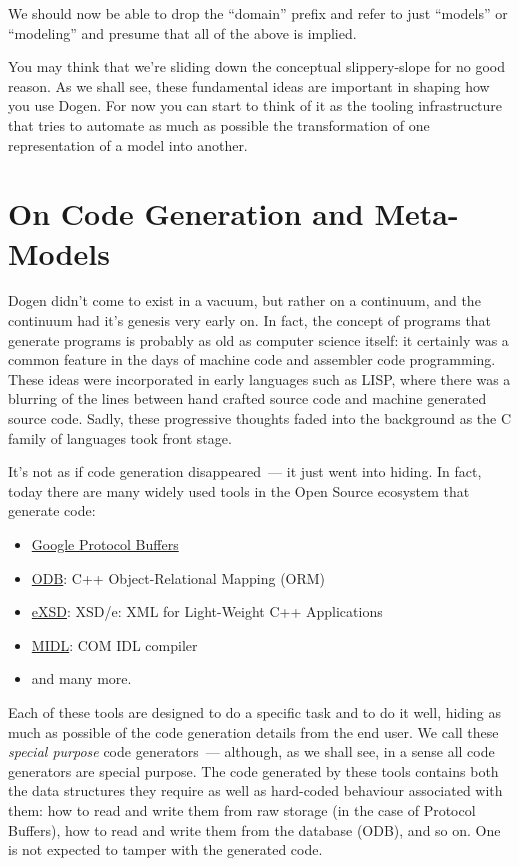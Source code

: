 \documentclass{book}
\begin{document}
We should now be able to drop the ``domain'' prefix and refer to just
``models'' or ``modeling'' and presume that all of the above is implied.

You may think that we're sliding down the conceptual slippery-slope
for no good reason. As we shall see, these fundamental ideas are
important in shaping how you use Dogen. For now you can start to think
of it as the tooling infrastructure that tries to automate as much as
possible the transformation of one representation of a model into
another.

\section{On Code Generation and Meta-Models}

Dogen didn't come to exist in a vacuum, but rather on a continuum, and
the continuum had it's genesis very early on. In fact, the concept of
programs that generate programs is probably as old as computer science
itself: it certainly was a common feature in the days of machine code
and assembler code programming. These ideas were incorporated in early
languages such as LISP, where there was a blurring of the lines
between hand crafted source code and machine generated source
code. Sadly, these progressive thoughts faded into the background as
the C family of languages took front stage.

It's not as if code generation disappeared~--- it just went into
hiding. In fact, today there are many widely used tools in the Open
Source ecosystem that generate code:

\begin{itemize}
\item \href{https://developers.google.com/protocol-buffers/}{Google Protocol Buffers}
\item \href{http://www.codesynthesis.com/products/odb/}{ODB}: C++ Object-Relational Mapping (ORM)
\item \href{http://www.codesynthesis.com/products/xsde/}{eXSD}: XSD/e: XML for Light-Weight C++ Applications
\item \href{http://msdn.microsoft.com/en-us/library/windows/desktop/aa367300(v\%3Dvs.85).aspx}{MIDL}: COM IDL compiler
\item and many more.
\end{itemize}

Each of these tools are designed to do a specific task and to do it
well, hiding as much as possible of the code generation details from
the end user. We call these \emph{special purpose} code generators~---
although, as we shall see, in a sense all code generators are special
purpose. The code generated by these tools contains both the data
structures they require as well as hard-coded behaviour associated
with them: how to read and write them from raw storage (in the case of
Protocol Buffers), how to read and write them from the database (ODB),
and so on. One is not expected to tamper with the generated code.
\end{document}
